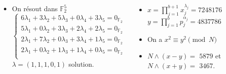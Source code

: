 \documentclass{beamer}
\begin{document}
\begin{frame}


{\small
\begin{columns}
\begin{itemize}[<+->]
    \item On résout dans $\mathbb F_2^5$
    \[
    \begin{cases}
    6\lambda_1 + 3\lambda_2 + 5\lambda_3 + 0\lambda_4 + 3\lambda_5 = 0_{\mathbb F_2} \\
    5\lambda_1 + 0\lambda_2 + 3\lambda_3 + 2\lambda_4 + 2\lambda_5 = 0_{\mathbb F_2} \\
    2\lambda_1 + 7\lambda_2 + 0\lambda_3 + 3\lambda_4 + 1\lambda_5 = 0_{\mathbb F_2} \\
    2\lambda_1 + 0\lambda_2 + 1\lambda_3 + 1\lambda_4 + 0\lambda_5 = 0_{\mathbb F_2} \\
    \end{cases}
    \]
    $\lambda = (1, 1, 1, 0, 1)$ solution.
\end{itemize}

\begin{itemize}[<+->]
    \item $x = \prod_{j=1}^{b+1}x_j^{\lambda_j} = 7248176$ \\ $y = \prod_{j=1}^b p_j^{\alpha_j} = 4837786$
    \item On a $x^2 \equiv y^2 \pmod N$
    \item $N \land (x-y) =$ \alert<6>{$5879$} et $N \land  (x+y) =$ \alert<6>{$3467$}.
\end{itemize}

\end{columns}
}
\end{frame}
\end{document}
